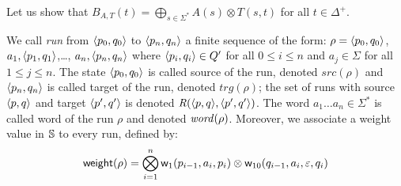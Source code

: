 %
%
Let us show that 
$B_{A, T}(t) = \displaystyle\bigoplus_{s\in \Sigma^*} A(s) \otimes T(s, t)$
for all $t\in \Delta^+$.

\noindent
We call \emph{run} from $\< p_0, q_0>$ to $\< p_n, q_n>$ 
a finite sequence of the form:
$\rho = \< p_0, q_0>$, $a_1, \< p_1, q_1>$,\ldots, $a_n, \< p_n, q_n>$
where $\< p_i, q_i> \in Q'$ for all $0 \leq i \leq n$
and $a_j \in \Sigma$ for all $1 \leq j \leq n$.
The state $\< p_0, q_0>$ is called source of the run, denoted $\mathit{src}(\rho)$
and $\< p_n, q_n>$ is called target of the run, denoted $\mathit{trg}(\rho)$;
the set of runs with source $\< p, q>$ and target $\< p', q'>$ 
is denoted $\Rho(\< p, q>, \< p', q'>)$.
The word $a_1\ldots a_n \in \Sigma^*$ is called word of the run $\rho$
and denoted $\mathit{word}(\rho)$.
Moreover, we associate a weight value in $\mathbb{S}$ to every run, 
defined by:
\begin{equation} \label{def:weight-run}
\mathsf{weight}(\rho) = \bigotimes_{i = 1}^{n} 
\mathsf{w}_1(p_{i-1}, a_i, p_i) \otimes
\mathsf{w}_{10}(q_{i-1}, a_i, \varepsilon, q_i)
\end{equation}

